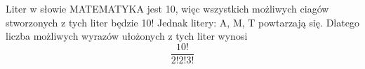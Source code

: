

\medskip
{} 
\medskip

Liter w słowie MATEMATYKA jest 10, więc wszystkich możliwych ciagów stworzonych z tych liter będzie 10!
Jednak litery: A, M, T powtarzają się. Dlatego liczba możliwych wyrazów ułożonych z tych liter wynosi
$$
\frac{10!}{2!2!3!}
$$


